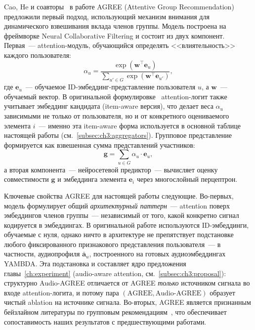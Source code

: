 Cao, He и соавторы~\cite{cao2018agree} в работе AGREE (Attentive Group Recommendation) предложили первый подход, использующий механизм внимания для динамического взвешивания вклада членов группы. Модель построена на фреймворке Neural Collaborative Filtering и состоит из двух компонент. Первая~--- attention-модуль, обучающийся определять <<влиятельность>> каждого пользователя:
\begin{equation*}
    \alpha_u = \frac{\exp(\mathbf{w}^\top \mathbf{e}_u)}{\sum_{u' \in G} \exp(\mathbf{w}^\top \mathbf{e}_{u'})},
\end{equation*}
где $\mathbf{e}_u$~--- обучаемое ID-эмбеддинг-представление пользователя $u$, а $\mathbf{w}$~--- обучаемый вектор. В оригинальной формулировке~\cite{cao2018agree} attention-логит также учитывает эмбеддинг кандидата (item-aware версия), что делает веса $\alpha_u$ зависимыми не только от пользователя, но и от конкретного оцениваемого элемента $i$~--- именно эта item-aware форма используется в основной таблице настоящей работы (см.~\ref{subsec:ch3:aggregators}). Групповое представление формируется как взвешенная сумма представлений участников:
\begin{equation*}
    \mathbf{g} = \sum_{u \in G} \alpha_u \cdot \mathbf{e}_u,
\end{equation*}
а вторая компонента~--- нейросетевой предиктор~--- вычисляет оценку совместимости $\mathbf{g}$ и эмбеддинга элемента $\mathbf{e}_i$ через многослойный перцептрон.

Ключевые свойства AGREE для настоящей работы следующие. Во-первых, модель формулирует общий \emph{архитектурный паттерн}~--- attention поверх эмбеддингов членов группы~--- независимый от того, какой конкретно сигнал кодируется в эмбеддингах. В оригинальной работе используются ID-эмбеддинги, обучаемые с нуля, однако ничто в архитектуре не препятствует подстановке любого фиксированного признакового представления пользователя~--- в частности, аудиопрофиля $\bar{\mathbf{a}}_u$, построенного на готовых аудиоэмбеддингах YAMBDA. Эта подстановка и составляет ядро предложения главы~\ref{ch:experiment} (audio-aware attention, см.~\ref{subsec:ch3:proposal}): структурно Audio-AGREE отличается от AGREE \emph{только} источником сигнала во входе attention-логита, и потому пара $(\text{AGREE}, \text{Audio-AGREE})$ образует чистый ablation на источнике сигнала. Во-вторых, AGREE является признанным бейзлайном литературы по групповым рекомендациям~\cite{sankar2020groupim, xu2024aligngroup}, что обеспечивает сопоставимость наших результатов с предшествующими работами.

